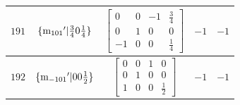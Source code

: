\documentclass[fleqn,8pt]{jsarticle}
\begin{document}
\begin{longtable}{ccccc}
$ 191 $ & $ \{{\rm m}_{101}{}'|\frac{3}{4} 0 \frac{1}{4}\} $ & $ \begin{bmatrix} 0 & 0 & -1 & \frac{3}{4} \\ 0 & 1 & 0 & 0 \\ -1 & 0 & 0 & \frac{1}{4} \end{bmatrix} $ & $ -1 $ & $ -1 $ \\ \hline
$ 192 $ & $ \{{\rm m}_{-101}{}'|0 0 \frac{1}{2}\} $ & $ \begin{bmatrix} 0 & 0 & 1 & 0 \\ 0 & 1 & 0 & 0 \\ 1 & 0 & 0 & \frac{1}{2} \end{bmatrix} $ & $ -1 $ & $ -1 $ \\
\end{longtable}
\end{document}
